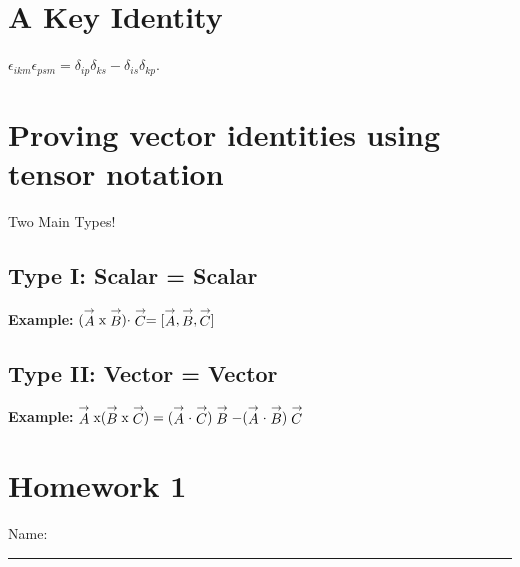 \section{A Key Identity}
{\flushleft $\epsilon_{ikm}\epsilon_{psm} = \delta_{ip}\delta_{ks} -  \delta_{is}\delta_{kp}$.}

\vspace{.2in}
\section{Proving vector identities using tensor notation}

Two Main Types!
\vspace{.1in}
\subsection{Type I: Scalar = Scalar}

{\bf \flushleft Example:} $ (\stackrel{\rightarrow}{A} \textup{x} \stackrel{\rightarrow}{B})\cdot \stackrel{\rightarrow}{C} = [\stackrel{\rightarrow}{A} , \stackrel{\rightarrow}{B} , \stackrel{\rightarrow}{C}] $

\vspace{.5in}

\subsection{Type II: Vector = Vector}

{\bf \flushleft Example:} $ \stackrel{\rightarrow}{A} \textup{x} (\stackrel{\rightarrow}{B}\textup{x} \stackrel{\rightarrow}{C})= ( \stackrel{\rightarrow}{A}\cdot \stackrel{\rightarrow}{C})\stackrel{\rightarrow}{B}  -   (\stackrel{\rightarrow}{A}\cdot \stackrel{\rightarrow}{B}) \stackrel{\rightarrow}{C}$

\newpage
\thispagestyle{empty}
\section*{Homework 1}
{\flushleft Name:} \rule{3.5in}

\vspace{.1in}

